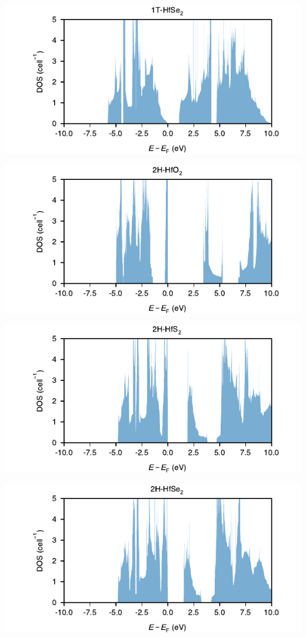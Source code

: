 \begin{center}
\includegraphics[width=.9\linewidth]{img/SI_figs/1T-HfSe2-DOS.pdf}
\end{center}
\begin{center}
\includegraphics[width=.9\linewidth]{img/SI_figs/2H-HfO2-DOS.pdf}
\end{center}
\begin{center}
\includegraphics[width=.9\linewidth]{img/SI_figs/2H-HfS2-DOS.pdf}
\end{center}
\begin{center}
\includegraphics[width=.9\linewidth]{img/SI_figs/2H-HfSe2-DOS.pdf}
\end{center}
